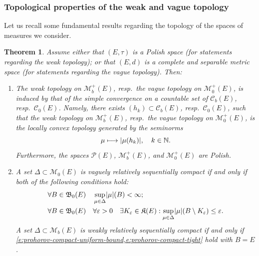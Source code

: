 \documentclass[JEP,XML,SOM,Unicode,published]{cedram}
\newcommand\mto{\mathchoice{\longmapsto}{\mapsto}{\mapsto}{\mapsto}}
\newtheorem{theorem}{Theorem}[section]
\theoremstyle{definition}
\theoremstyle{remark}
\DeclarePairedDelimiter{\abs}{\lvert}{\rvert}
\begin{document}
\subsubsection{Topological properties of the weak and vague topology}
Let us recall some fundamental results regarding the topology of the spaces of measures we consider.

\begin{theorem}\label{t:prohorov}
Assume either that $(E, \tau)$ is a Polish space (for statements regarding the weak topology); or that $(E, d)$ is a complete and separable metric space (for statements regarding the vague topology).
Then:
\begin{enumerate}[$(\rm i)$, wide]
\item\label{i:prohorov-polish}
The weak topology on $\mathscr{M}_{b}^{+}(E)$, resp.\ the vague topology on $\mathscr{M}_{0}^{+}(E)$, is induced by that of the simple convergence on a countable set of $\mathscr{C}_{b}(E)$, resp.\ $\mathscr{C}_{0}(E)$.
Namely, there exists $(h_{k}) \subset \mathscr{C}_{b}(E)$, resp.\ $\mathscr{C}_{0}(E)$, such that the weak topology on $\mathscr{M}_{b}^{+}(E)$, resp.\ the vague topology on $\mathscr{M}_{0}^{+}(E)$, is the locally convex topology generated by the seminorms
\begin{equation*}
\mu \mto \abs{\mu(h_{k})}, \quad k \in \mathbb{N}.
\end{equation*}
Furthermore, the spaces $\mathscr{P}(E)$, $\mathscr{M}_{b}^{+}(E)$, and $\mathscr{M}^{+}_{0}(E)$ are Polish.
\item\label{i:prohorov-compact}
A set $\Delta \subset \mathscr{M}_{0}(E)$ is vaguely relatively sequentially compact if and only if both of the following conditions hold:
\begin{subequations}\label{e:prohorov-compact}
\begin{align}
& \label{e:prohorov-compact-uniform-bound} \forall B \in \mathfrak{B}_{0}(E)\quad \sup_{\mu \in \Delta} \abs{\mu}(B) < \infty; \\
& \label{e:prohorov-compact-tight} \forall B \in \mathfrak{B}_{0}(E) \quad \forall \varepsilon > 0 \quad \exists K_{\varepsilon} \in \mathfrak{K}(E) : \sup_{\mu \in \Delta} \abs{\mu}(B \setminus K_{\varepsilon}) \leq \varepsilon.
\end{align}
\end{subequations}
A set $\Delta \subset \mathscr{M}_{b}(E)$ is weakly relatively sequentially compact if and only if \cref{e:prohorov-compact-uniform-bound,e:prohorov-compact-tight} hold with $B = E$.
\end{enumerate}
\end{theorem}
\end{document}
